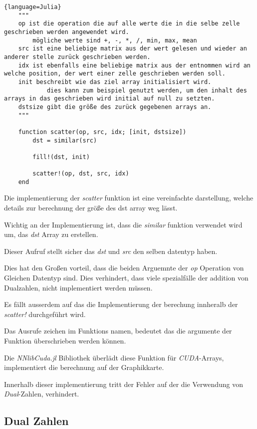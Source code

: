 \begin{lstlisting}{language=Julia}
	"""
	op ist die operation die auf alle werte die in die selbe zelle geschrieben werden angewendet wird.
		mögliche werte sind +, -, *, /, min, max, mean
	src ist eine beliebige matrix aus der wert gelesen und wieder an anderer stelle zurück geschrieben werden.
	idx ist ebenfalls eine beliebige matrix aus der entnommen wird an welche position, der wert einer zelle geschrieben werden soll.
	init beschreibt wie das ziel array initialisiert wird.
			dies kann zum beispiel genutzt werden, um den inhalt des arrays in das geschrieben wird initial auf null zu setzten.
	dstsize gibt die größe des zurück gegebenen arrays an.
	"""

	function scatter(op, src, idx; [init, dstsize])
		dst = similar(src)
		
		fill!(dst, init)
		
		scatter!(op, dst, src, idx)
	end
\end{lstlisting}

Die implementierung der \textit{scatter} funktion ist eine vereinfachte darstellung, 
welche details zur berechnung der größe des dst array weg lässt.

Wichtig an der Implementierung ist, dass die \textit{similar} funktion verwendet wird um, das
\textit{dst} Array zu erstellen.

Dieser Aufruf stellt sicher das \textit{dst} und \textit{src} den selben datentyp haben.

Dies hat den Großen vorteil, 
dass die beiden Arguemnte der \textit{op} Operation von Gleichen Datentyp sind. 
Dies verhindert, 
dass viele spezialfälle der addition von Dualzahlen, nicht implementiert werden müssen.

Es fällt ausserdem auf das die Implementierung der berechung innheralb der \textit{scatter!}
durchgeführt wird.


Das Ausrufe zeichen im Funktions namen, bedeutet das die argumente der Funktion überschrieben werden können.


Die \textit{NNlibCuda.jl} Bibliothek überlädt diese Funktion für \textit{CUDA}-Arrays,
implementiert die berechnung auf der Graphikkarte.

Innerhalb dieser implementierung tritt der Fehler auf der die Verwendung von \textit{Dual}-Zahlen,
verhindert.
	
\subsection{Dual Zahlen}

